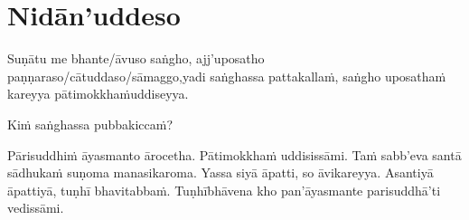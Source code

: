
\section{Nidān'uddeso}
\label{nidan'uddeso}

\ifninebythirteenversion\vspace{0.2em}\fi
\ifafiveversion\vspace{0.2em}\fi

Suṇātu me bhante/āvuso saṅgho, ajj'uposatho paṇṇaraso/cātuddaso/sāmaggo,\makeatletter\hyperlink{endnote15-appendix}\makeatother \thinspace yadi saṅghassa pattakallaṁ, saṅgho uposathaṁ kareyya pātimokkhaṁ\makeatletter\hyperlink{endnote14-appendix}\makeatother \thinspace uddiseyya.

Kiṁ saṅghassa pubbakiccaṁ?

Pārisuddhiṁ āyasmanto ārocetha. Pātimokkhaṁ uddisissāmi. Taṁ sabb'eva santā sādhukaṁ suṇoma manasikaroma. Yassa siyā āpatti, so āvikareyya\makeatletter\hyperlink{endnote16-appendix}\makeatother \thinspace. Asantiyā āpattiyā, tuṇhī bhavitabbaṁ. Tuṇhībhāvena kho pan'āyasmante parisuddhā'ti vedissāmi.


